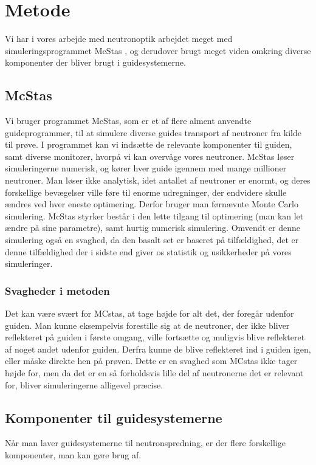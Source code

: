\documentclass[12pt,oneside,a4paper]{article}
\begin{document}
{{{{{%
\section{Metode}
Vi har i vores arbejde med neutronoptik arbejdet meget med simuleringsprogrammet McStas \cite{doi:10.1080/10448639908233684}, og derudover brugt meget viden omkring diverse komponenter der bliver brugt i guidesystemerne.


\subsection{McStas}
Vi bruger programmet McStas, som er et af flere alment anvendte guideprogrammer, til at simulere diverse guides transport af neutroner fra kilde til prøve. I programmet kan vi indsætte de relevante komponenter til guiden, samt diverse monitorer, hvorpå vi kan overvåge vores neutroner. McStas løser simuleringerne numerisk, og kører hver guide igennem med mange millioner neutroner. Man løser ikke analytisk, idet antallet af neutroner er enormt, og deres forskellige bevægelser ville føre til enorme udregninger, der endvidere skulle ændres ved hver eneste optimering. Derfor bruger man førnævnte Monte Carlo simulering. McStas styrker består i den lette tilgang til optimering (man kan let ændre på sine parametre), samt hurtig numerisk simulering. Omvendt er denne simulering også en svaghed, da den basalt set er baseret på tilfældighed, det er denne tilfældighed der i sidste end giver os statistik og usikkerheder på vores simuleringer.

\subsubsection{Svagheder i metoden}
Det kan være svært for MCstas, at tage højde for alt det, der foregår udenfor guiden. Man kunne eksempelvis forestille sig at de neutroner, der ikke bliver reflekteret på guiden i første omgang, ville fortsætte og muligvis blive reflekteret af noget andet udenfor guiden. Derfra kunne de blive reflekteret ind i guiden igen, eller måske direkte hen på prøven. Dette er en svaghed som MCstas ikke tager højde for, men da det er en så forholdsvis lille del af neutronerne det er relevant for, bliver simuleringerne alligevel præcise.


\subsection{Komponenter til guidesystemerne}
Når man laver guidesystemerne til neutronspredning, er der flere forskellige komponenter, man kan gøre brug af.

}}}}}
\end{document}
